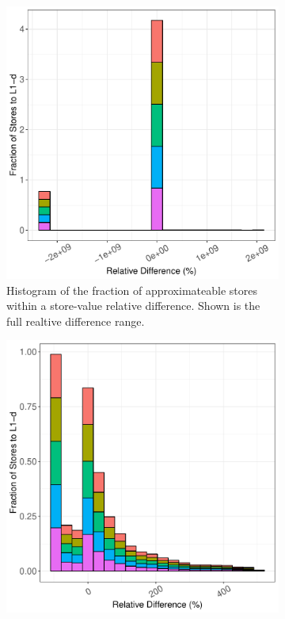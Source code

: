 \begin{figure}[htbp]
	\begin{subfigure}{0.33\textwidth}
		\centering
		\includegraphics[scale=0.4]{graphs/kmeans_top5/full_hist.pdf}
		\caption{Histogram of the fraction of approximateable stores within a store-value relative difference. Shown is the full realtive difference range.}
	\end{subfigure}
	\begin{subfigure}{0.33\textwidth}
		\centering
		\includegraphics[scale=0.4]{graphs/kmeans_top5/narrow_hist.pdf}

\end{subfigure}
\end{figure}
